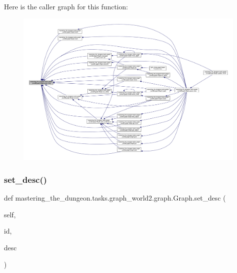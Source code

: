 Here is the caller graph for this function\+:
\nopagebreak
\begin{figure}[H]
\begin{center}
\leavevmode
\includegraphics[width=350pt]{classmastering__the__dungeon_1_1tasks_1_1graph__world2_1_1graph_1_1Graph_a4a99f9a773c1a5939fc45c50f92b4449_icgraph}
\end{center}
\end{figure}
\mbox{\label{classmastering__the__dungeon_1_1tasks_1_1graph__world2_1_1graph_1_1Graph_ac75e6e8afd506f1cfbcc4f540891ce87}} 
\subsubsection{\texorpdfstring{set\+\_\+desc()}{set\_desc()}}
{\footnotesize\ttfamily def mastering\+\_\+the\+\_\+dungeon.\+tasks.\+graph\+\_\+world2.\+graph.\+Graph.\+set\+\_\+desc (\begin{DoxyParamCaption}\item[{}]{self,  }\item[{}]{id,  }\item[{}]{desc }\end{DoxyParamCaption})}



